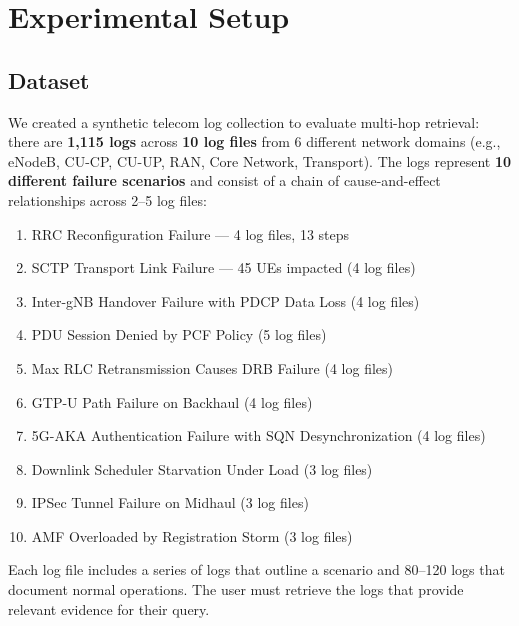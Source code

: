 \documentclass[11pt,a4paper]{article}
\begin{document}

\section{Experimental Setup}
\label{sec:setup}

\subsection{Dataset}

We created a synthetic telecom log collection to evaluate multi-hop
retrieval: there are \textbf{1{,}115 logs} across \textbf{10 log
files} from 6 different network domains (e.g., eNodeB, CU-CP, CU-UP,
RAN, Core Network, Transport).
The logs represent \textbf{10 different failure scenarios} and consist
of a chain of cause-and-effect relationships across 2--5 log files:

\begin{enumerate}[nosep]
    \item RRC Reconfiguration Failure --- 4 log files, 13 steps
    \item SCTP Transport Link Failure --- 45 UEs impacted (4 log files)
    \item Inter-gNB Handover Failure with PDCP Data Loss (4 log files)
    \item PDU Session Denied by PCF Policy (5 log files)
    \item Max RLC Retransmission Causes DRB Failure (4 log files)
    \item GTP-U Path Failure on Backhaul (4 log files)
    \item 5G-AKA Authentication Failure with SQN Desynchronization (4 log files)
    \item Downlink Scheduler Starvation Under Load (3 log files)
    \item IPSec Tunnel Failure on Midhaul (3 log files)
    \item AMF Overloaded by Registration Storm (3 log files)
\end{enumerate}

Each log file includes a series of logs that outline a scenario and
80--120 logs that document normal operations.
The user must retrieve the logs that provide relevant evidence for
their query.
\end{document}
